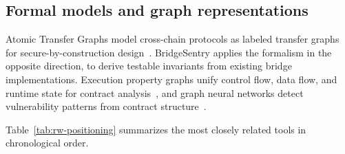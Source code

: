 \documentclass[a4paper]{cas-sc}
\begin{document}
\subsection{Formal models and graph representations}

Atomic Transfer Graphs model cross-chain protocols as labeled transfer graphs for secure-by-construction design~\citep{dubler2025atg}. BridgeSentry applies the formalism in the opposite direction, to derive testable invariants from existing bridge implementations. Execution property graphs unify control flow, data flow, and runtime state for contract analysis~\citep{qin2025epg}, and graph neural networks detect vulnerability patterns from contract structure~\citep{zhuang2020smart, liu2023gnn}.

Table~\ref{tab:rw-positioning} summarizes the most closely related tools in chronological order.
\end{document}

